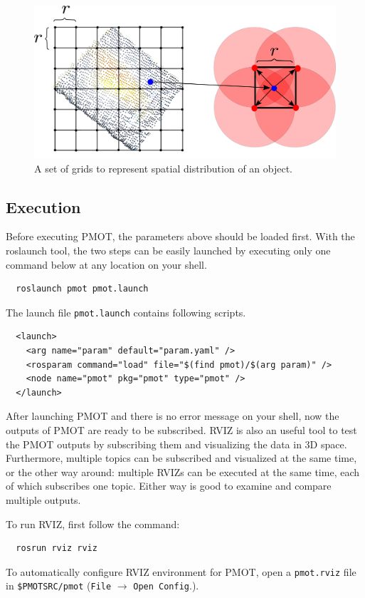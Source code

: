 \documentclass[a4paper,twoside, openright,12pt]{report}
\begin{document}
\begin{figure}[b]
	\centering
	\includegraphics[width=0.7\linewidth]{fig/2dgrid.pdf}
	\caption{A set of grids to represent spatial distribution of an object.}
	\label{fig:grid}
\end{figure}

\subsection{Execution}
Before executing PMOT, the parameters above should be loaded first. With the roslaunch tool, the two steps can be easily launched by executing only one command below at any location on your shell. 
\begin{verbatim}
  roslaunch pmot pmot.launch
\end{verbatim}

The launch file \verb|pmot.launch| contains following scripts.
\begin{verbatim}
  <launch>
    <arg name="param" default="param.yaml" />
    <rosparam command="load" file="$(find pmot)/$(arg param)" />
    <node name="pmot" pkg="pmot" type="pmot" />
  </launch>
\end{verbatim}

After launching PMOT and there is no error message on your shell, now the outputs of PMOT are ready to be subscribed.
RVIZ is also an useful tool to test the PMOT outputs by subscribing them and visualizing the data in 3D space. Furthermore, multiple topics can be subscribed and visualized at the same time, or the other way around: multiple RVIZs can be executed at the same time, each of which subscribes one topic. Either way is good to examine and compare multiple outputs.

To run RVIZ, first follow the command:
\begin{verbatim}
  rosrun rviz rviz
\end{verbatim}

To automatically configure RVIZ environment for PMOT, open a \verb|pmot.rviz| file in \verb|$PMOTSRC/pmot| (\verb|File| $\rightarrow$ \verb|Open Config|.).
\end{document}
